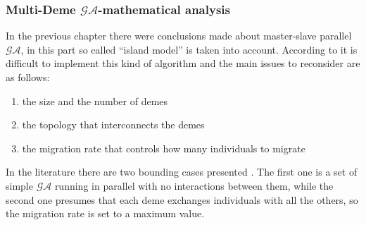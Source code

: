 \subsubsection{Multi-Deme $\mathcal{GA}$-mathematical analysis}
\label{cha:CoarsedGa}
In the previous chapter there were conclusions made about master-slave parallel
$\mathcal{GA}$, in this part so called ``island model'' is taken into account.
According to \cite{bib21} it is difficult to implement this kind of algorithm
and the main issues to reconsider are as follows:
\begin{enumerate}
	\item the size and the number of demes
	\item the topology that interconnects the demes
	\item the migration rate that controls how many individuals to migrate
\end{enumerate}
In the literature there are two bounding cases presented \cite{bib24}. The first
one is a set of simple $\mathcal{GA}$ running in parallel with no interactions between them,
while the second one presumes that each deme exchanges individuals with all the
others, so the migration rate is set to a maximum value. 

